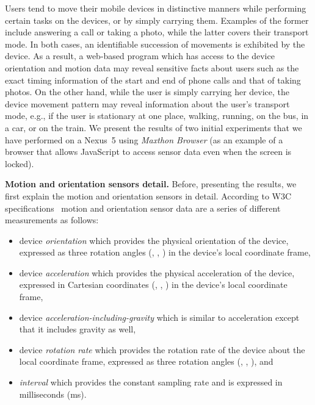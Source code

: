 \documentclass[10pt,twocolumn]{article}
\begin{document}
Users tend to move their mobile devices in distinctive manners while performing certain tasks on the devices, or by simply carrying them. 
Examples of the former include answering a call or taking a photo, while the latter covers their transport mode. 
In both cases, an identifiable succession of movements is exhibited by the device. 
As a result, a web-based program which has 
access to the device orientation and motion data 
may reveal sensitive facts about users such as the exact timing information of the start and end of phone calls and that of taking photos. 
On the other hand, while the user is simply carrying her device, the device movement pattern may reveal information about the user's transport mode, e.g., if the user is stationary at one place, walking, running, on the bus, in a car, or on the train. 
We present the results of two initial experiments that we have performed on a Nexus~5 using \textit{Maxthon Browser} (as an example of a browser that allows JavaScript to access sensor data even when the screen is locked). 


\textbf{Motion and orientation sensors detail.} Before, presenting the results, we first explain the motion and orientation sensors in detail. According to W3C specifications~\cite{W3CMotion} motion and orientation sensor data are a series of different measurements as follows:
\begin{itemize}
\item device \emph{orientation} which provides the physical orientation of the device, expressed as three rotation angles (, , ) in the device's local coordinate frame,

\item device \emph{acceleration} which provides the physical acceleration of the device, expressed in Cartesian coordinates (, , ) in the device's local coordinate frame,

\item device \emph{acceleration-including-gravity} which is similar to acceleration except that it includes gravity as well,

\item device \emph{rotation rate} which provides the rotation rate of the device about the local coordinate frame, expressed as three rotation angles (, , ), and

\item \emph{interval} which provides the constant sampling rate 
and is expressed in milliseconds (ms).
\end{itemize}
\end{document}
